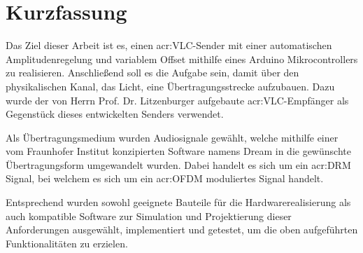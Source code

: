 

\chapter*{Kurzfassung}
\label{sec:abstract}

Das Ziel dieser Arbeit ist es, einen \gls{acr:VLC}-Sender mit einer automatischen Amplitudenregelung und variablem Offset mithilfe eines Arduino Mikrocontrollers zu realisieren. Anschließend soll es die Aufgabe sein, damit über den physikalischen Kanal, das Licht, eine Übertragungsstrecke aufzubauen. Dazu wurde der von Herrn Prof. Dr. Litzenburger aufgebaute \gls{acr:VLC}-Empfänger als Gegenstück dieses entwickelten Senders verwendet.

Als Übertragungsmedium wurden Audiosignale gewählt, welche mithilfe einer vom Fraunhofer Institut konzipierten Software namens Dream in die gewünschte Übertragungsform umgewandelt wurden. Dabei handelt es sich um ein \gls{acr:DRM} Signal, bei welchem es sich um ein \gls{acr:OFDM} moduliertes Signal handelt.

Entsprechend wurden sowohl geeignete Bauteile für die Hardwarerealisierung als auch kompatible Software zur Simulation und Projektierung dieser Anforderungen ausgewählt, implementiert
und getestet, um die oben aufgeführten Funktionalitäten zu erzielen.